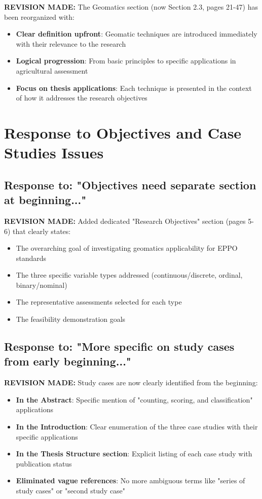 \documentclass[11pt,a4paper]{article}
\begin{document}
\textbf{REVISION MADE:} The Geomatics section (now Section 2.3, pages 21-47) has been reorganized with:
\begin{itemize}
\item \textbf{Clear definition upfront}: Geomatic techniques are introduced immediately with their relevance to the research
\item \textbf{Logical progression}: From basic principles to specific applications in agricultural assessment
\item \textbf{Focus on thesis applications}: Each technique is presented in the context of how it addresses the research objectives
\end{itemize}

\section{Response to Objectives and Case Studies Issues}

\subsection{Response to: "Objectives need separate section at beginning..."}

\textbf{REVISION MADE:} Added dedicated "Research Objectives" section (pages 5-6) that clearly states:
\begin{itemize}
\item The overarching goal of investigating geomatics applicability for EPPO standards
\item The three specific variable types addressed (continuous/discrete, ordinal, binary/nominal)
\item The representative assessments selected for each type
\item The feasibility demonstration goals
\end{itemize}

\subsection{Response to: "More specific on study cases from early beginning..."}

\textbf{REVISION MADE:} Study cases are now clearly identified from the beginning:
\begin{itemize}
\item \textbf{In the Abstract}: Specific mention of "counting, scoring, and classification" applications
\item \textbf{In the Introduction}: Clear enumeration of the three case studies with their specific applications
\item \textbf{In the Thesis Structure section}: Explicit listing of each case study with publication status
\item \textbf{Eliminated vague references}: No more ambiguous terms like "series of study cases" or "second study case"
\end{itemize}
\end{document}
